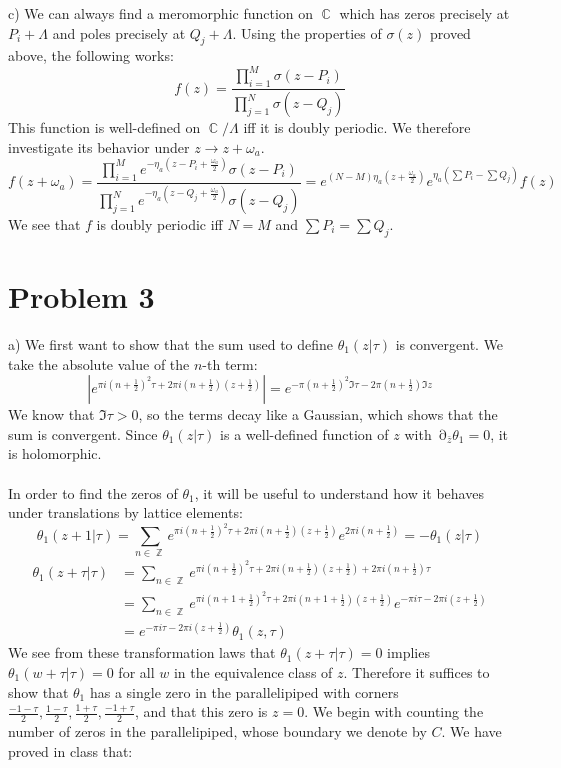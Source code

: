 \documentclass[12 pt]{article}
\DeclareMathOperator {\p} {\partial}
\DeclareMathOperator {\C} {\mathbb{C}}
\DeclareMathOperator {\Z} {\mathbb{Z}}
\theoremstyle{plain}
\theoremstyle{definition}
\theoremstyle{remark}
\begin{document}
c) We can always find a meromorphic function on $\C$ which has zeros precisely at $P_i + \Lambda$ and poles precisely at $Q_j + \Lambda$. Using the properties of $\sigma(z)$ proved above, the following works:
\[        f(z) = \frac{\prod_{i=1}^M \sigma(z - P_i)}{\prod_{j=1}^N \sigma(z - Q_j)}     \]
This function is well-defined on $\C/\Lambda$ iff it is doubly periodic. We therefore investigate its behavior under $z \to z + \omega_a$.
\[        f(z + \omega_a) =     \frac{\prod_{i=1}^M e^{-\eta_a(z - P_i + \frac{\omega_a}{2})} \sigma(z - P_i)}{\prod_{j=1}^N e^{-\eta_a(z - Q_j + \frac{\omega_a}{2})} \sigma(z - Q_j)}  = e^{(N-M) \eta_a (z + \frac{\omega_a}{2})} e^{\eta_a (\sum P_i - \sum Q_j)} f(z) \]
We see that $f$ is doubly periodic iff $N=M$ and $\sum P_i = \sum Q_j$.



\section*{Problem 3}
a) We first want to show that the sum used to define $\theta_1 (z|\tau)$ is convergent. We take the absolute value of the $n$-th term:
\[      | e^{\pi i (n+ \frac{1}{2})^2 \tau + 2\pi i (n+\frac{1}{2}) (z+ \frac{1}{2})} | =  e^{-\pi (n+\frac{1}{2})^2 \Im \tau - 2\pi(n+ \frac{1}{2}) \Im z}    \]
We know that $\Im \tau >0$, so the terms decay like a Gaussian, which shows that the sum is convergent. Since $\theta_1(z|\tau)$ is a well-defined function of $z$ with $\p_{\bar z} \theta_1 = 0$, it is holomorphic.
\\
\\
In order to find the zeros of $\theta_1$, it will be useful to understand how it behaves under translations by lattice elements:
\[       \theta_1(z+1 | \tau) = \sum_{n\in \Z}  e^{\pi i (n+ \frac{1}{2})^2 \tau + 2\pi i (n+\frac{1}{2}) (z + \frac{1}{2})} e^{2\pi i (n+\frac{1}{2})} = - \theta_1(z | \tau)     \]
\begin{align*}     \theta_1(z+ \tau | \tau) &= \sum_{n\in \Z}  e^{\pi i (n+ \frac{1}{2})^2 \tau + 2\pi i (n+\frac{1}{2}) (z + \frac{1}{2}) + 2\pi i (n+\frac{1}{2}) \tau}      \\
    &=  \sum_{n\in \Z}  e^{\pi i (n+ 1+ \frac{1}{2})^2 \tau + 2\pi i (n + 1 + \frac{1}{2}) (z + \frac{1}{2})}  e^{-\pi i \tau - 2\pi i (z+\frac{1}{2})}    \\
 &= e^{-\pi i \tau - 2\pi i (z+\frac{1}{2})} \theta_1(z, \tau)
\end{align*}
We see from these transformation laws that $\theta_1(z+\tau | \tau) = 0$ implies $\theta_1(w+\tau | \tau) = 0$ for all $w$ in the equivalence class of $z$. Therefore it suffices to show that $\theta_1$ has a single zero in the parallelipiped with corners $\frac{-1-\tau}{2} , \frac{1-\tau}{2} , \frac{1 + \tau}{2}, \frac{-1+\tau}{2}$, and that this zero is $z=0$. We begin with counting the number of zeros in the parallelipiped, whose boundary we denote by $C$. We have proved in class that:
\end{document}
